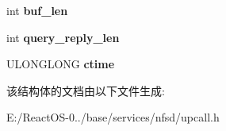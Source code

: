 \begin{DoxyCompactItemize}
\mbox{\label{struct____getattr__upcall__args_a02c8659bc5e2c8384ce2a7334f0075a7}} 
int {\bfseries buf\+\_\+len}
\item 
\mbox{\label{struct____getattr__upcall__args_a93dfbf4b6749647e9b9ecb031a1ea307}} 
int {\bfseries query\+\_\+reply\+\_\+len}
\item 
\mbox{\label{struct____getattr__upcall__args_ab592349893e87dff60918e6d253cae8b}} 
U\+L\+O\+N\+G\+L\+O\+NG {\bfseries ctime}
\end{DoxyCompactItemize}


该结构体的文档由以下文件生成\+:\begin{DoxyCompactItemize}
\item 
E\+:/\+React\+O\+S-\/0../base/services/nfsd/upcall.\+h\end{DoxyCompactItemize}
